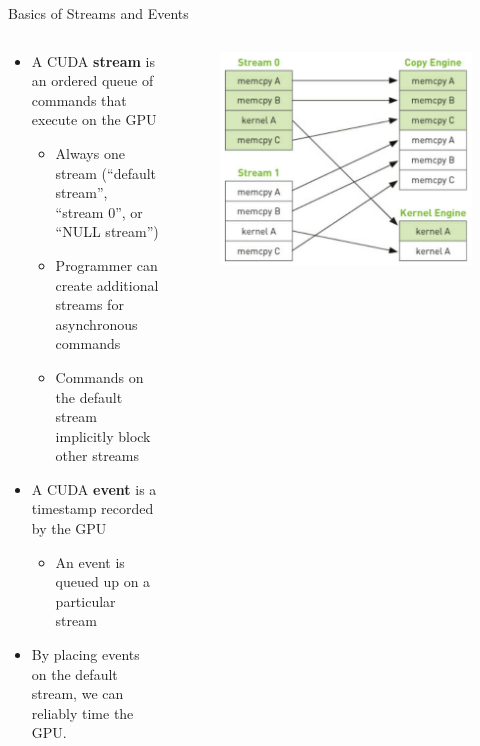 \documentclass{beamer}
\begin{document}
    \begin{frame}{Basics of Streams and Events}
        \begin{columns}
            \begin{column}{0.6\textwidth}
                \begin{itemize}
                    \item A CUDA \textbf{stream} is an ordered queue of commands that execute on the GPU
                    \begin{itemize}
                        \item Always one stream (``default stream'', ``stream 0'', or ``NULL stream'')
                        \item Programmer can create additional streams for asynchronous commands
                        \item Commands on the default stream implicitly block other streams
                    \end{itemize}
                    \item A CUDA \textbf{event} is a timestamp recorded by the GPU
                    \begin{itemize}
                        \item An event is queued up on a particular stream
                    \end{itemize}
                    \item By placing events on the default stream, we can reliably time the GPU.
                \end{itemize}
            \end{column}
            \begin{column}{0.4\textwidth}
                \begin{figure}
                    \centering
                    \includegraphics[width=\textwidth]{img/04/cu-by-ex-10-3.png}
                \end{figure}
            \end{column}
        \end{columns}
    \end{frame}
\end{document}
